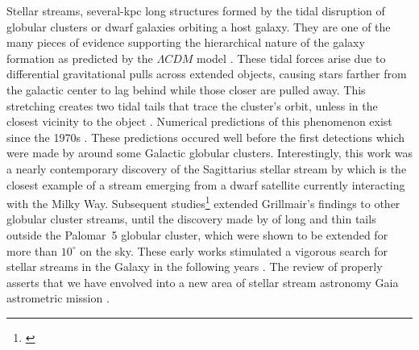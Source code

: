 \documentclass[draft]{aa}
\begin{document}
  Stellar streams, several-kpc long structures formed by the tidal disruption of globular clusters or dwarf galaxies orbiting a host galaxy. They are one of the many pieces of evidence supporting the hierarchical nature of the galaxy formation as predicted by the $\Lambda CDM$ model \citep{1991ApJ...379...52W}. These tidal forces arise due to differential gravitational pulls across extended objects, causing stars farther from the galactic center to lag behind while those closer are pulled away. This stretching creates two tidal tails that trace the cluster's orbit, unless in the closest vicinity to the object \citep{2007ApJ...659.1212M}. Numerical predictions of this phenomenon exist since the 1970s \citep[see, for example][]{1975AJ.....80..290K}. These predictions occured well before the first detections which were made by \citet{1995AJ....109.2553G} around some Galactic globular clusters. Interestingly, this work was a nearly contemporary discovery of the Sagittarius stellar stream by \citet{1994Natur.370..194I} which is the closest example of a stream emerging from a dwarf satellite currently interacting with the Milky Way. Subsequent studies\footnote{\citep[see][for more subsequent observation detections of tidal debris, i.e. globular cluster stars beyond the tidal radius.]{1997A&A...320..776L, 2000A&A...356..127T, 2000A&A...359..907L, 2001AAS...19910906S, 2003AJ....126..815L}} extended Grillmair's findings to other globular cluster streams, until the discovery made by \citet{2001ApJ...548L.165O,2002AAS...200.1001O, 2003AJ....126.2385O} of long and thin tails outside the Palomar~5 globular cluster, which were shown to be extended for more than $10^\circ$ on the sky. These early works stimulated a vigorous search for stellar streams in the Galaxy in the following years \citep{2006ApJ...643L..17G, 2006ApJ...637L..29B, 2006ApJ...637L..29B, 2009ApJ...693.1118G}. The review of \citet{2024arXiv240519410B} properly asserts that we have envolved into a new area of stellar stream astronomy Gaia astrometric mission \citep{2016A&A...595A...1G}. 
  
\end{document}
